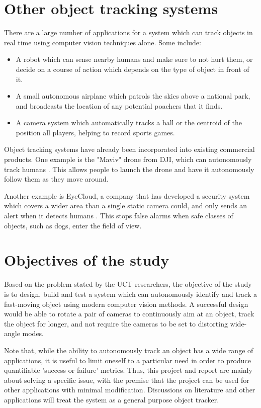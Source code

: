\section{Other object tracking systems}
There are a large number of applications for a system which can track objects in real time using computer vision techniques alone. Some include:

\begin{itemize}
\item A robot which can sense nearby humans and make sure to not hurt them, or decide on a course of action which depends on the type of object in front of it.
\item A small autonomous airplane which patrols the skies above a national park, and broadcasts the location of any potential poachers that it finds.
\item A camera system which automatically tracks a ball or the centroid of the position all players, helping to record sports games.
\end{itemize}

Object tracking systems have already been incorporated into existing commercial products. One example is the "Maviv" drone from DJI, which can autonomously track humans \cite{website:DJI_mavic}. This allows people to launch the drone and have it autonomously follow them as they move around.

Another example is EyeCloud, a company that has developed a security system which covers a wider area than a single static camera could, and only sends an alert when it detects humans \cite{website:eyecloud}. This stops false alarms when safe classes of objects, such as dogs, enter the field of view.



\section{Objectives of the study}
Based on the problem stated by the UCT researchers, the objective of the study is to design, build and test a system which can autonomously identify and track a fast-moving object using modern computer vision methods. A successful design would be able to rotate a pair of cameras to continuously aim at an object, track the object for longer, and not require the cameras to be set to distorting wide-angle modes.

Note that, while the ability to autonomously track an object has a wide range of applications, it is useful to limit oneself to a particular need in order to produce quantifiable 'success or failure' metrics. Thus, this project and report are mainly about solving a specific issue, with the premise that the project can be used for other applications with minimal modification. Discussions on literature and other applications will treat the system as a general purpose object tracker.



